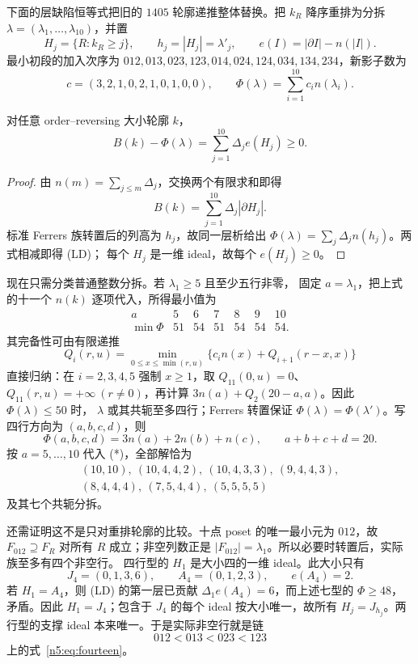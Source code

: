 下面的层缺陷恒等式把旧的 \(1405\) 轮廓递推整体替换。把 \(k_R\)
降序重排为分拆 \(\lambda=(\lambda_1,\ldots,\lambda_{10})\)，并置
\[
 H_j=\{R:k_R\ge j\},\qquad h_j=|H_j|=\lambda'_j,
 \qquad e(I)=|\partial I|-n(|I|).
\]
最小初段的加入次序为
\(012,013,023,123,014,024,124,034,134,234\)，新影子数为
\[
 c=(3,2,1,0,2,1,0,1,0,0),\qquad
 \Phi(\lambda)=\sum_{i=1}^{10}c_i n(\lambda_i).
\]

\begin{lemma}[层缺陷恒等式]\label{n5:lem:layerdefect}
对任意 order--reversing 大小轮廓 \(k\)，
\[
 \boxed{B(k)-\Phi(\lambda)
 =\sum_{j=1}^{10}\Delta_j e(H_j)\ge0.}                  \tag{LD}
\]
\end{lemma}

\begin{proof}
由 \(n(m)=\sum_{j\le m}\Delta_j\)，交换两个有限求和即得
\[
 B(k)=\sum_{j=1}^{10}\Delta_j|\partial H_j|.
\]
标准 Ferrers 族转置后的列高为 \(h_j\)，故同一层析给出
\(\Phi(\lambda)=\sum_j\Delta_jn(h_j)\)。两式相减即得 (LD)；
每个 \(H_j\) 是一维 ideal，故每个 \(e(H_j)\ge0\)。
\end{proof}

现在只需分类普通整数分拆。若 \(\lambda_1\ge5\) 且至少五行非零，
固定 \(a=\lambda_1\)，把上式的十一个 \(n(k)\) 逐项代入，所得最小值为
\[
\begin{array}{c|rrrrrr}
a&5&6&7&8&9&10\\ \hline
\min\Phi&51&54&51&54&54&54.
\end{array}                                                \tag{***}
\]
其完备性可由有限递推
\[
 Q_i(r,u)=\min_{0\le x\le\min(r,u)}
 \{c_i n(x)+Q_{i+1}(r-x,x)\}
\]
直接归纳：在 \(i=2,3,4,5\) 强制 \(x\ge1\)，取
\(Q_{11}(0,u)=0\)、\(Q_{11}(r,u)=+\infty\ (r\ne0)\)，再计算
\(3n(a)+Q_2(20-a,a)\)。因此 \(\Phi(\lambda)\le50\) 时，
\(\lambda\) 或其共轭至多四行；Ferrers 转置保证
\(\Phi(\lambda)=\Phi(\lambda')\)。写四行方向为 \((a,b,c,d)\)，则
\[
 \Phi(a,b,c,d)=3n(a)+2n(b)+n(c),\qquad a+b+c+d=20.
\]
按 \(a=5,\ldots,10\) 代入 (*)，全部解恰为
\begin{equation}\label{n5:eq:fourteen}
\begin{gathered}
 (10,10),\ (10,4,4,2),\ (10,4,3,3),\ (9,4,4,3),\\
 (8,4,4,4),\ (7,5,4,4),\ (5,5,5,5)
\end{gathered}
\end{equation}
及其七个共轭分拆。

还需证明这不是只对重排轮廓的比较。十点 poset 的唯一最小元为
\(012\)，故 \(F_{012}\supseteq F_R\) 对所有 \(R\) 成立；非空列数正是
\(|F_{012}|=\lambda_1\)。所以必要时转置后，实际族至多有四个非空行。
四行型的 \(H_1\) 是大小四的一维 ideal。此大小只有
\[
 J_4=(0,1,3,6),\qquad A_4=(0,1,2,3),\qquad e(A_4)=2.
\]
若 \(H_1=A_4\)，则 (LD) 的第一层已贡献
\(\Delta_1e(A_4)=6\)，而上述七型的 \(\Phi\ge48\)，矛盾。因此
\(H_1=J_4\)；包含于 \(J_4\) 的每个 ideal 按大小唯一，故所有
\(H_j=J_{h_j}\)。两行型的支撑 ideal 本来唯一。于是实际非空行就是链
\[
 012<013<023<123
\]
上的式~\eqref{n5:eq:fourteen}。

